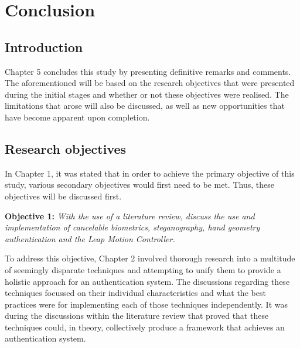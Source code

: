 \chapter{Conclusion}


\section{Introduction}

Chapter 5 concludes this study by presenting definitive remarks and comments. The aforementioned will be based on the research objectives that were presented during the initial stages and whether or not these objectives were realised. The limitations that arose will also be discussed, as well as new opportunities that have become apparent upon completion.

\section{Research objectives}

In Chapter 1, it was stated that in order to achieve the primary objective of this study, various secondary objectives would first need to be met. Thus, these objectives will be discussed first.


\textbf{Objective 1:} \textit{With the use of a literature review, discuss the use and implementation of cancelable biometrics, steganography, hand geometry authentication and the Leap Motion Controller.}


To address this objective, Chapter 2 involved thorough research into a multitude of seemingly disparate techniques and attempting to unify them to provide a holistic approach for an authentication system. The discussions regarding these techniques focussed on their individual characteristics and what the best practices were for implementing each of those techniques independently. It was during the discussions within the literature review that proved that these techniques could, in theory, collectively produce a framework that achieves an authentication system.\\

